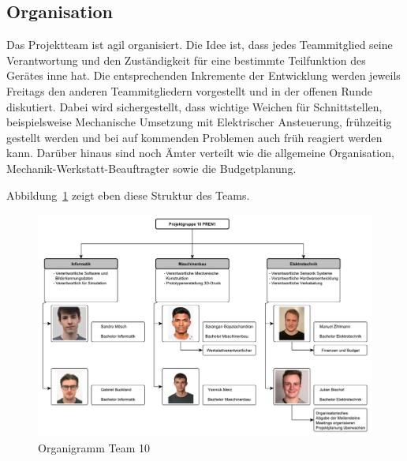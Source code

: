\documentclass[main.tex]{subfiles} %
\begin{document}

\subsection{Organisation}

Das Projektteam ist agil organisiert. Die Idee ist, dass jedes Teammitglied
seine Verantwortung und den Zuständigkeit für eine bestimmte Teilfunktion des
Gerätes inne hat. Die entsprechenden Inkremente der Entwicklung werden jeweils
Freitags den anderen Teammitgliedern vorgestellt und in der offenen Runde
diskutiert. Dabei wird sichergestellt, dass wichtige Weichen für
Schnittstellen, beispielsweise Mechanische Umsetzung mit Elektrischer
Ansteuerung, frühzeitig gestellt werden und bei auf kommenden Problemen auch
früh reagiert werden kann. Darüber hinaus sind noch Ämter verteilt wie die
allgemeine Organisation, Mechanik-Werkstatt-Beauftragter sowie die
Budgetplanung.

Abbildung~\ref{fig:Organigramm} zeigt eben diese Struktur des Teams.

\begin{figure}[h!]
    \centering
    \includegraphics[page=1, width=1\textwidth]{./fig_Projektmanagement/Organigramm.pdf}
    \caption{Organigramm Team 10}\label{fig:Organigramm}
\end{figure}
\end{document}

